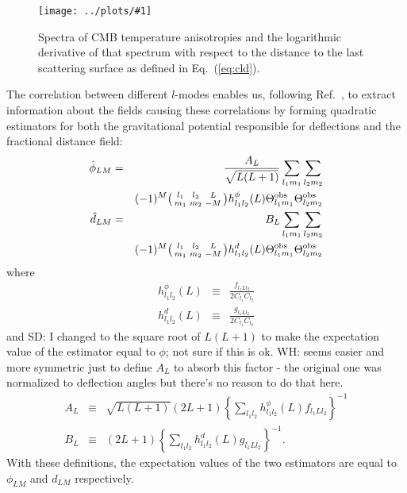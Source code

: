 \documentclass[prl,amsmath,amssymb,floatfix,superscriptaddress,nofootinbib,twocolumn]{revtex4-1}
\def\bea{\begin{eqnarray}}
\def\eea{\end{eqnarray}}
\newcommand{\ec}[1]{Eq.~(\ref{eq:#1})}
\newcommand{\eql}[1]{\label{eq:#1}}
\newcommand{\sfig}[2]{
\texttt{[image: ../plots/\#1]}
        }
\newcommand{\Spng}[2]{
   \begin{figure}[thbp]
   \begin{center}
    \sfig{#1.png}{\columnwidth}
    \caption{{\small #2}}
    \label{fig:#1}
     \end{center}
   \end{figure}
}
\newcommand{\scott}[1]{{\color{darkgreen} SD: #1}}
\newcommand{\peikai}[1]{{\color{blue} PL: #1}}
\newcommand{\wh}[1]{{\color{red} WH: #1}}
\begin{document}
\Spng{TT1}{Spectra of CMB temperature anisotropies and the logarithmic derivative of that spectrum with respect to the distance to the last scattering surface as defined in \ec{cld}.}


The correlation between different $l$-modes enables us, following Ref.~\cite{Okamoto:2003zw}, to extract information about the fields causing these correlations by forming quadratic estimators for both the gravitational potential responsible for deflections and the fractional distance field:
\bea
\hat \phi_{LM} &=& \frac{A_{L}}{\sqrt{L(L+1)}}\sum_{l_1m_1}\sum_{l_2m_2} \nonumber \\  
&& (-1)^M  \bigl(\begin{smallmatrix} l_1 & l_2 & L \\ m_1 & m_2 & -M  \end{smallmatrix}\bigr) h^{\phi}_{l_1l_2}(L)  \tob_{l_1m_1} \tob_{l_2m_2} \\
\hat d_{LM} &=& B_{L} \sum_{l_1m_1}\sum_{l_2m_2}\nonumber \\
&& (-1)^M  \bigl(\begin{smallmatrix} l_1 & l_2 & L \\ m_1 & m_2 & -M  \end{smallmatrix}\bigr) h^{d}_{l_1l_2}(L)  \tob_{l_1m_1} \tob_{l_2m_2}\eql{distest}
\eea
where
\bea
h^{\phi}_{l_1l_2}(L)&\equiv& \frac{f_{l_1Ll_2}}{2C_{l_1}C_{l_2}} \\
h^{d}_{l_1l_2}(L)&\equiv& \frac{g_{l_1Ll_2}}{2C_{l_1}C_{l_2}}
\eea
and \scott{I changed to the square root of $L(L+1)$ to make the expectation value of the estimator equal to $\phi$; not sure if this is ok.} \wh{seems easier and more symmetric just to define $A_L$ to absorb this factor - the original one was normalized to
deflection angles but there's no reason to do that here.} %
\bea
A_L &\equiv& \sqrt{L(L+1)}(2L+1) \left\{ \sum_{l_1l_2} h^{\phi}_{l_1l_2}(L)f_{l_1Ll_2}\right\}^{-1}\\
B_L &\equiv& (2L+1) \left\{ \sum_{l_1l_2} h^{d}_{l_1l_2}(L)g_{l_1Ll_2}\right\}^{-1}.\eql{bt}
\eea 
With these definitions, the expectation values of the two estimators are equal to $\phi_{LM}$ and $d_{LM}$ respectively.
\end{document}
